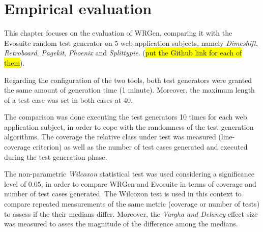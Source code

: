 \chapter{Empirical evaluation} \label{ch:EmpEvaluation}
This chapter focuses on the evaluation of WRGen, comparing it with the Evosuite random test generator on 5 web application subjects, namely \textit{Dimeshift}, \textit{Retroboard}, \textit{Pagekit}, \textit{Phoenix} and \textit{Splittypie}. (\hl{put the Github link for each of them}).

Regarding the configuration of the two tools, both test generators were granted the same amount of generation time (1 minute). Moreover, the maximum length of a test case was set in both cases at 40.

The comparison was done executing the test generators 10 times for each web application subject, in order to cope with the randomness of the test generation algorithms. The coverage the relative class under test was measured (line-coverage criterion) as well as the number of test cases generated and executed during the test generation phase. 

The non-parametric \textit{Wilcoxon} statistical test was used considering a significance level of $0.05$, in order to compare WRGen and Evosuite in terms of coverage and number of test cases generated. The Wilcoxon test is used in this context to compare repeated measurements of the same metric (coverage or number of tests) to assess if the their medians differ. Moreover, the \emph{Vargha and Delaney} effect size was measured to asses the magnitude of the difference among the medians.



